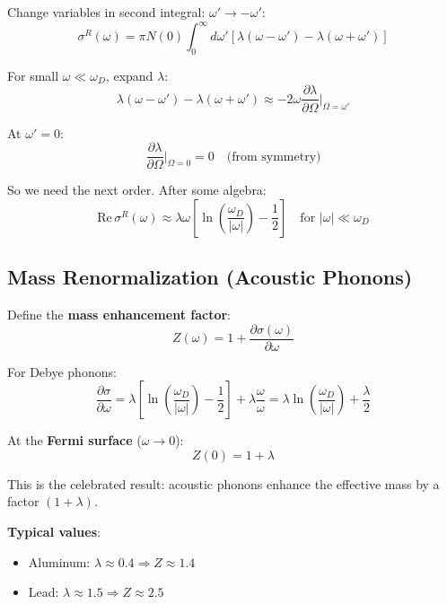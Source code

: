 \documentclass[12pt]{article}
\begin{document}
Change variables in second integral: $\omega' \to -\omega'$:
\begin{equation}
\sigma^R(\omega) = \pi N(0) \int_0^{\infty} d\omega' [\lambda(\omega - \omega') - \lambda(\omega + \omega')]
\end{equation}

For small $\omega \ll \omega_D$, expand $\lambda$:
\begin{equation}
\lambda(\omega - \omega') - \lambda(\omega + \omega') \approx -2\omega \frac{\partial\lambda}{\partial\Omega}\Big|_{\Omega = \omega'}
\end{equation}

At $\omega' = 0$:
\begin{equation}
\frac{\partial\lambda}{\partial\Omega}\Big|_{\Omega = 0} = 0 \quad \text{(from symmetry)}
\end{equation}

So we need the next order. After some algebra:
\begin{equation}
\boxed{
\text{Re}\,\sigma^R(\omega) \approx \lambda \omega \left[\ln\left(\frac{\omega_D}{|\omega|}\right) - \frac{1}{2}\right] \quad \text{for } |\omega| \ll \omega_D
}
\end{equation}

\subsection{Mass Renormalization (Acoustic Phonons)}

Define the \textbf{mass enhancement factor}:
\begin{equation}
\boxed{
Z(\omega) = 1 + \frac{\partial \sigma(\omega)}{\partial \omega}
}
\end{equation}

For Debye phonons:
\begin{equation}
\frac{\partial \sigma}{\partial \omega} = \lambda \left[\ln\left(\frac{\omega_D}{|\omega|}\right) - \frac{1}{2}\right] + \lambda \frac{\omega}{\omega} = \lambda \ln\left(\frac{\omega_D}{|\omega|}\right) + \frac{\lambda}{2}
\end{equation}

At the \textbf{Fermi surface} ($\omega \to 0$):
\begin{equation}
\boxed{
Z(0) = 1 + \lambda
}
\end{equation}

This is the celebrated result: acoustic phonons enhance the effective mass by a factor $(1 + \lambda)$.

\textbf{Typical values}:
\begin{itemize}
\item Aluminum: $\lambda \approx 0.4 \Rightarrow Z \approx 1.4$
\item Lead: $\lambda \approx 1.5 \Rightarrow Z \approx 2.5$
\end{itemize}
\end{document}
